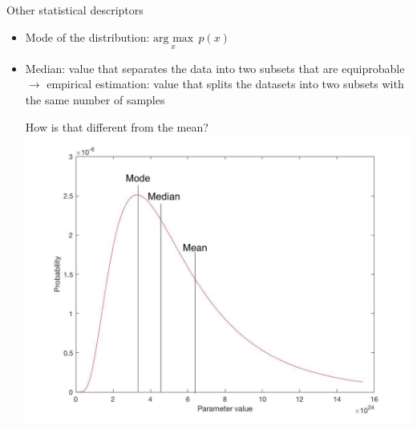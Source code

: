\documentclass{beamer}
\begin{document}
\begin{frame}{Other statistical descriptors}
\begin{itemize}
\item Mode of the distribution: $\underset{x}{\textrm{arg\ max}} \ \ p(x)$
\item Median: value that separates the data into two subsets that are equiprobable\\
$\rightarrow$ empirical estimation:  value that splits the datasets into two subsets with the same number of samples\\
\vspace{0.5cm}

How is that different from the mean?\\
\vspace{0.2cm}
\includegraphics[scale=0.15]{modemeanmedian.jpg}

\end{itemize}
\end{frame}
\end{document}
